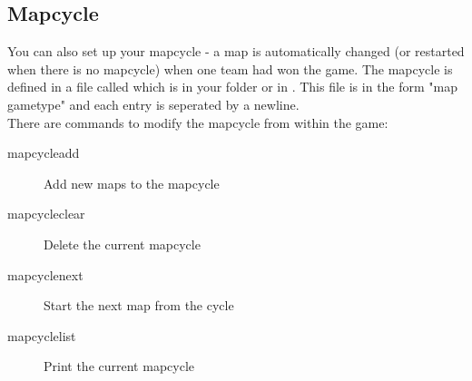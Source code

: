 \subsection{Mapcycle}
You can also set up your mapcycle - a map is automatically changed (or restarted when there is no mapcycle) when one team had won the game. The mapcycle is defined in a file called  which is in your  folder or in . This file is in the form "map gametype" and each entry is seperated by a newline.\\
There are commands to modify the mapcycle from within the game:
\begin{description}
\item[mapcycleadd] Add new maps to the mapcycle
\item[mapcycleclear] Delete the current mapcycle
\item[mapcyclenext] Start the next map from the cycle
\item[mapcyclelist] Print the current mapcycle
\end{description}
